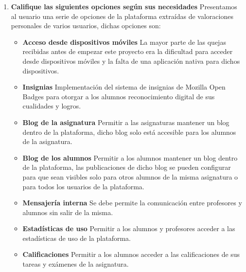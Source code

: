 \begin{enumerate}
  \item \textbf{Califique las siguientes opciones según sus necesidades} Presentamos al usuario una serie de opciones de la plataforma extraídas de valoraciones personales de varios usuarios, dichas opciones son:

  		\begin{itemize}
  			\item \textbf{Acceso desde dispositivos móviles} La mayor parte de las quejas recibidas antes de empezar este proyecto era la dificultad para acceder desde dispositivos móviles y la falta de una aplicación nativa para dichos dispositivos.
  			\item \textbf{Insignias} Implementación del sistema de insignias de Mozilla Open Badges para otorgar a los alumnos reconocimiento digital de sus cualidades y logros.
  			\item \textbf{Blog de la asignatura} Permitir a las asignaturas mantener un blog dentro de la plataforma, dicho blog solo está accesible para los alumnos de la asignatura.
  			\item \textbf{Blog de los alumnos} Permitir a los alumnos mantener un blog dentro de la plataforma, las publicaciones de dicho blog se pueden configurar para que sean visibles solo para otros alumnos de la misma asignatura o para todos los usuarios de la plataforma.
  			\item \textbf{Mensajería interna} Se debe permite la comunicación entre profesores y alumnos sin salir de la misma.
  			\item \textbf{Estadísticas de uso} Permitir a los alumnos y profesores acceder a las estadísticas de uso de la plataforma.
  			\item \textbf{Calificaciones} Permitir a los alumnos acceder a las calificaciones de sus tareas y exámenes de la asignatura.

		\end{itemize}




\end{enumerate}
